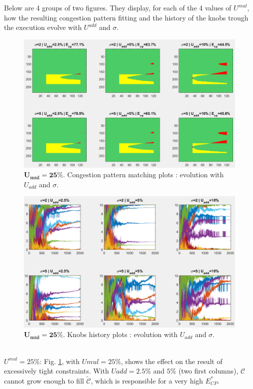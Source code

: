 Below are 4 groups of two figures. They display, for each of the 4 values of $U^{mul}$, how the resulting congestion pattern fitting and the history of the knobs trough the execution evolve with $U^{add}$ and $\sigma$.\\
\begin{figure}
	\label{fig:umulcp25}
	\caption{$\mathbf{U_{mul}=25\%}$. Congestion pattern matching plots : evolution with $U_{add}$ and $\sigma$.}
	\includegraphics[width=7in]{figures/results_figures/Umul/cp_Umul_25_lambda_11.png}
\end{figure}	
\begin{figure}
	\label{fig:umulknobs25}
	\caption{$\mathbf{U_{mul}=25\%}$. Knobs history plots : evolution with $U_{add}$ and $\sigma$.}
	\includegraphics[width=7in]{figures/results_figures/Umul/knobs_Umul_25_lambda_11.png}
\end{figure}	
\\
\emph{$U^{mul}=25\% $}: Fig. \ref{fig:umulcp25}, with $U{mul}=25\% $, shows the effect on the result of excessively tight constraints.  With $U{add}=2.5\% $ and $5\% $ (two first columns), $\mathscr{C}$ cannot grow enough to fill $\widetilde{\mathscr{C}}$, which is responsible for a very high $E_{CP}^{*}$.\\
